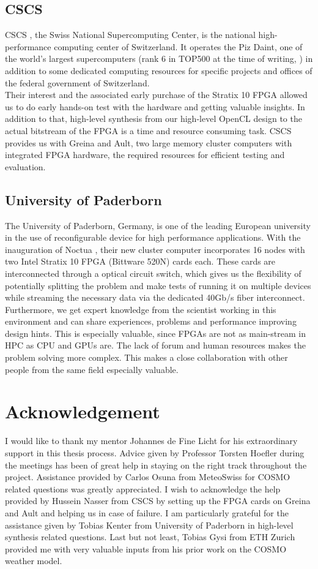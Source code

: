 \subsection{CSCS}
CSCS \cite{label45}, the Swiss National Supercomputing Center, is the national high-performance computing center of Switzerland. It operates the Piz Daint, one of the world's largest supercomputers (rank 6 in TOP500 at the time of writing, \cite{label42}) in addition to some dedicated computing resources for specific projects and offices of the federal government of Switzerland. \\
Their interest and the associated early purchase of the Stratix 10 FPGA allowed us to do early hands-on test with the hardware and getting valuable insights. In addition to that, high-level synthesis from our high-level OpenCL design to the actual bitstream of the FPGA is a time and resource consuming task. CSCS provides us with Greina and Ault, two large memory cluster computers with integrated FPGA hardware, the required resources for efficient testing and evaluation.


\subsection{University of Paderborn}
The University of Paderborn, Germany, is one of the leading European university in the use of reconfigurable device for high performance applications. With the inauguration of Noctua \cite{label46}, their new cluster computer incorporates 16 nodes with two Intel Stratix 10 FPGA (Bittware 520N) cards each. These cards are interconnected through a optical circuit switch, which gives us the flexibility of potentially splitting the problem and make tests of running it on multiple devices while streaming the necessary data via the dedicated 40Gb/s fiber interconnect. \\
Furthermore, we get expert knowledge from the scientist working in this environment and can share experiences, problems and performance improving design hints. This is especially valuable, since FPGAs are not as main-stream in HPC as CPU and GPUs are. The lack of forum and human resources makes the problem solving more complex. This makes a close collaboration with other people from the same field especially valuable.


\section{Acknowledgement}
I would like to thank my mentor Johannes de Fine Licht for his extraordinary support in this thesis process. Advice given by Professor Torsten Hoefler during the meetings has been of great help in staying on the right track throughout the project. Assistance provided by Carlos Osuna from MeteoSwiss for COSMO related questions was greatly appreciated. I wish to acknowledge the help provided by Hussein Nasser from CSCS by setting up the FPGA cards on Greina and Ault and helping us in case of failure. I am particularly grateful for the assistance given by Tobias Kenter from University of Paderborn in high-level synthesis related questions. Last but not least, Tobias Gysi from ETH Zurich provided me with very valuable inputs from his prior work on the COSMO weather model.
 